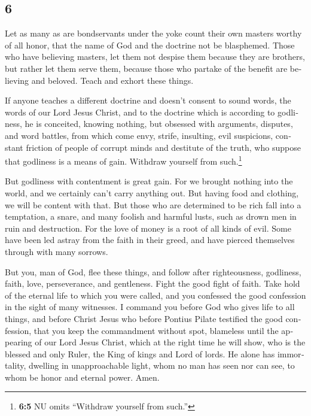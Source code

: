 \begin{paracol}{2}
\begin{otherlanguage}{english}
\hypertarget{section-11}{%
\section{6}\label{section-11}}

 Let as many as are bondservants under the yoke count
their own masters worthy of all honor, that the name of God and the
doctrine not be blasphemed.  Those who have believing
masters, let them not despise them because they are brothers, but rather
let them serve them, because those who partake of the benefit are
believing and beloved. Teach and exhort these things.

 If anyone teaches a different doctrine and doesn't
consent to sound words, the words of our Lord Jesus Christ, and to the
doctrine which is according to godliness,  he is
conceited, knowing nothing, but obsessed with arguments, disputes, and
word battles, from which come envy, strife, insulting, evil suspicions,
 constant friction of people of corrupt minds and
destitute of the truth, who suppose that godliness is a means of gain.
Withdraw yourself from such.\footnote{\textbf{6:5} NU omits ``Withdraw
  yourself from such.''}

 But godliness with contentment is great gain.
 For we brought nothing into the world, and we certainly
can't carry anything out.  But having food and clothing,
we will be content with that.  But those who are
determined to be rich fall into a temptation, a snare, and many foolish
and harmful lusts, such as drown men in ruin and destruction.
 For the love of money is a root of all kinds of evil.
Some have been led astray from the faith in their greed, and have
pierced themselves through with many sorrows.

 But you, man of God, flee these things, and follow after
righteousness, godliness, faith, love, perseverance, and gentleness.
 Fight the good fight of faith. Take hold of the eternal
life to which you were called, and you confessed the good confession in
the sight of many witnesses.  I command you before God
who gives life to all things, and before Christ Jesus who before Pontius
Pilate testified the good confession,  that you keep the
commandment without spot, blameless until the appearing of our Lord
Jesus Christ,  which at the right time he will show, who
is the blessed and only Ruler, the King of kings and Lord of lords.
 He alone has immortality, dwelling in unapproachable
light, whom no man has seen nor can see, to whom be honor and eternal
power. Amen.


\end{otherlanguage}
\end{paracol}
